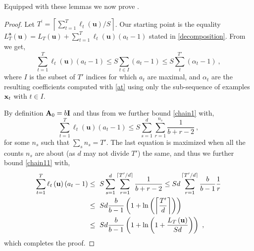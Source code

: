 Equipped with these lemmas we now prove .
\begin{proof}
Let $T^{'}=\left\lceil
  \sum_{t=1}^{T}\ell_{t}\left(\mathbf{u}\right)/S\right\rceil$. Our starting point is the equality
\(
L_{T}^{\boldsymbol{a}}(\mathbf{u}) =
L_{T}(\mathbf{u})+ \sum_{t=1}^{T} \ell_{t}\left(\mathbf{u}\right)
\left(a_{t}-1\right)
\)
stated in \eqref{decomposition}. From 
we get,
\begin{equation}
 \sum_{t=1}^{T} \ell_{t}\left(\mathbf{u}\right)
\left(a_{t}-1\right)
 \leq
S\sum_{t \in I}\left(a_{t}-1\right) \leq
S\sum_{t}^{T'}\left(\alpha_{t}-1\right) ~,
\label{chain1}
\end{equation}
where $I$ is the subset of $T'$ indices for which $a_t$ are maximal,
and $\alpha_t$ are the resulting coefficients computed with \eqref{at}
using only the
sub-sequence of examples $\mathbf{x}_{t}$ with $t\in I$.

By definition $\mathbf{A}_0 = b \mathbf{I}$ and thus from
 we further bound \eqref{chain1} with,
\begin{equation}
 \sum_{t=1}^{T} \ell_{t}\left(\mathbf{u}\right)
\left(a_{t}-1\right)
 \leq
S \sum_{s=1}^d \sum_{r=1}^{n_s}
\frac{1}{b+r-2} ~,
\label{chain11}
\end{equation}
for some $n_s$ such that $\sum_s n_s = T'$.
The last equation is maximized when all the counts $n_s$ are about (as
$d$ may not divide $T'$) the
same, and thus we further bound \eqref{chain11} with,
\begin{align*}
\sum_{t=1}^{T} \ell_{t}\left(\mathbf{u}\right)
\left(a_{t}-1\right)
 & \leq~ S \sum_{s=1}^d \sum_{r=1}^{\lceil T'/d \rceil}
\frac{1}{b+r-2}  \leq Sd \sum_{r=1}^{\lceil T'/d \rceil}
\frac{b}{b-1}\frac{1}{r}\\
 &\leq~ Sd \frac{b}{b-1} \left({1+\ln\left({\left\lceil\frac{T'}{d}\right\rceil}\right)}\right) \\
& \leq~ Sd \frac{b}{b-1} \left({1+\ln\left({1+\frac{L_T\left({\mathbf{u}}\right)}{Sd}}\right)}\right) ~,
\end{align*}
which completes the proof.
\QED
\end{proof}

